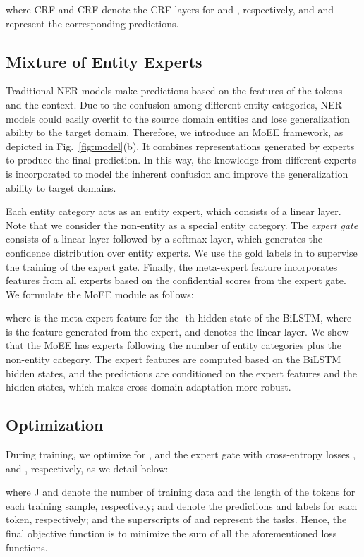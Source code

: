 \documentclass[11pt,a4paper]{article}
\begin{document}
where \textnormal{CRF} and \textnormal{CRF} denote the CRF layers for  and , respectively, 
and  and  represent the corresponding predictions.

\subsection{Mixture of Entity Experts}
Traditional NER models make predictions based on the features of the tokens and the context. Due to the confusion among different entity categories, NER models could easily overfit to the source domain entities and lose generalization ability to the target domain. Therefore, we introduce an MoEE framework, as depicted in Fig.~\ref{fig:model}(b).
It combines representations generated by experts to produce the final prediction. In this way, the knowledge from different experts is incorporated to model the inherent confusion and improve the generalization ability to target domains.



Each entity category acts as an entity expert, which consists of a linear layer. Note that we consider the non-entity as a special entity category.
The \textit{expert gate} consists of a linear layer followed by a softmax layer, which generates the confidence distribution over entity experts. We use the gold labels in  to supervise the training of the expert gate.
Finally, the meta-expert feature incorporates features from all experts based on the confidential scores from the expert gate. We formulate the MoEE module as follows:

where  is the meta-expert feature for the -th hidden state of the BiLSTM, where  is the feature generated from the expert, and  denotes the linear layer. We show that the MoEE has  experts following the number of entity categories plus the non-entity category.
The expert features are computed based on the BiLSTM hidden states, and the predictions are conditioned on the expert features and the hidden states, which makes cross-domain adaptation more robust.

\subsection{Optimization} During training, we optimize for ,  and the expert gate with cross-entropy losses ,  and , respectively, as we detail below:

where J and  denote the number of training data and the length of the tokens for each training sample, respectively;  and  denote the predictions and labels for each token, respectively; and the superscripts of  and  represent the tasks. Hence, the final objective function is to minimize the sum of all the aforementioned loss functions.
\end{document}
